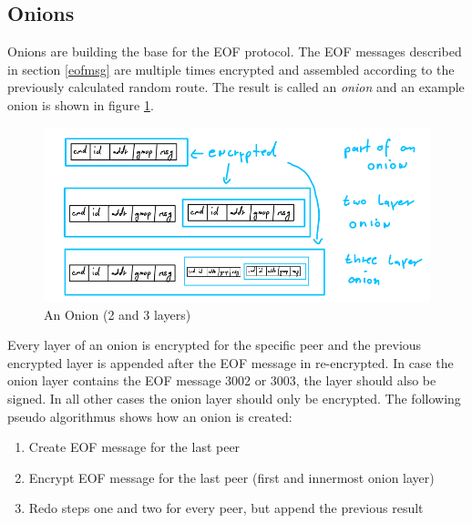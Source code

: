 \subsection{Onions}
\label{eofonion}
Onions are building the base for the EOF protocol.
The EOF messages described in section \ref{eofmsg}
are multiple times encrypted and assembled according to 
the previously calculated random route. 
The result is called an \textit{onion} and
an example onion is shown in figure \ref{onion}.
\begin{figure}
    \centering
    \caption{An Onion (2 and 3 layers)}
    \label{onion}
    \includegraphics[scale=0.8]{onion.png}
\end{figure}
Every layer of an onion is encrypted for the specific peer
and the previous encrypted layer is appended after the EOF message
in re-encrypted.
In case the onion layer contains the EOF message
3002 or 3003, the layer should also be signed. In all other
cases the onion layer should only be encrypted. The following
pseudo algorithmus shows how an onion is created:
\begin{enumerate}
\item Create EOF message for the last peer
\item Encrypt EOF message for the last peer (first and innermost onion layer)
\item Redo steps one and two for every peer, but append the previous result
\end{enumerate}
